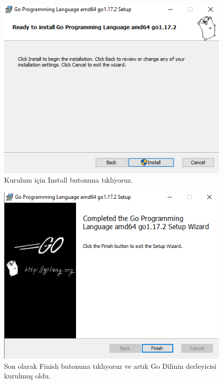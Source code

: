 \vspace{5mm}

\vspace{10mm}

\begin{figure}[!htb]
    \centering
    \includegraphics[width=0.6\linewidth]{00-images/06-installation.png}
    \caption{Kurulum için Install butonuna tıklıyoruz.}
    \label{fig:my_label}
\end{figure}

\vspace{5mm}

\vspace{10mm}

\begin{figure}[!htb]
    \centering
    \includegraphics[width=0.6\linewidth]{00-images/07-installation.png}
    \caption{Son olarak Finish butonuna tıklıyoruz ve artık Go Dilinin derleyicisi kurulmuş oldu.}
    \label{fig:my_label}
\end{figure}

\vspace{5mm}


